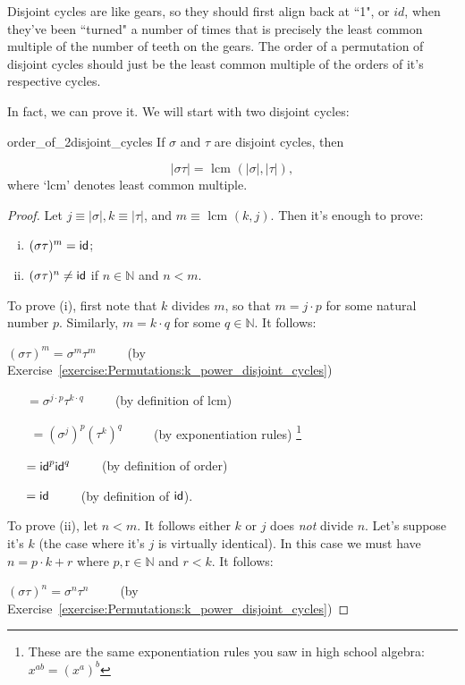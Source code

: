 Disjoint cycles are like gears, so they should first align back at ``1", or $id$, when they've been ``turned" a number of times that is precisely the least common multiple of the number of teeth on the gears.  The order of a permutation of disjoint cycles should just be the least common multiple of the orders of it's respective cycles.  

In fact,  we can prove it.  We will start with two disjoint cycles:

\begin{prop}{order_of_2disjoint_cycles}
If $\sigma$ and $\tau$ are disjoint cycles, then 

$$|\sigma \tau| = \mbox{ lcm }(|\sigma|,|\tau|),$$
where `lcm' denotes least common multiple.
\end{prop}

\begin{proof}  Let  $j \equiv |\sigma|, k \equiv |\tau|$, and $m \equiv \mbox{ lcm }(k,j)$. Then it's enough to prove:
\begin{enumerate}[(i)]
\item
$(\sigma \tau)^m = {\sf{i}d} $;
\item
$(\sigma \tau)^n \neq {\sf{i}d} $ if $n \in \mathbb{N}$ and $n < m$.
\end{enumerate}

\noindent
To prove (i), first note that $k$ divides $m$, so that $m = j \cdot p$ for some natural number $p$. Similarly, $m = k \cdot q$ for some $q \in \mathbb{N}$. It follows:

\noindent
$(\sigma \tau )^m = \sigma^m \tau^m$~~~~~(by Exercise~\ref{exercise:Permutations:k_power_disjoint_cycles})

~~~$=  \sigma^{j \cdot p} \tau^{ k \cdot q}$~~~~~(by definition of lcm)

~~~ $=  (\sigma^j)^p (\tau^ k)^q$~~~~~(by exponentiation rules)
\footnote{These are the same exponentiation rules you saw in high school algebra:  $x^{ab} = (x^a)^b$}

~~~$=   {\sf{i}d} ^p {\sf{i}d} ^q$~~~~~(by definition of order)

~~~$ = {\sf{i}d} $~~~~~(by definition of ${\sf{i}d} $).
\medskip

\noindent
To prove (ii), let $n < m$. It follows either $k$ or $j$ does \emph{not} divide $n$. Let's suppose it's $k$ (the case where it's $j$ is virtually identical). In this case we must have $n = p \cdot k + r$ where $p, $r$ \in \mathbb{N}$ and $r < k$. It follows:

\noindent
$(\sigma \tau )^n = \sigma^n \tau^n$~~~~~(by Exercise~\ref{exercise:Permutations:k_power_disjoint_cycles})


\end{proof}
